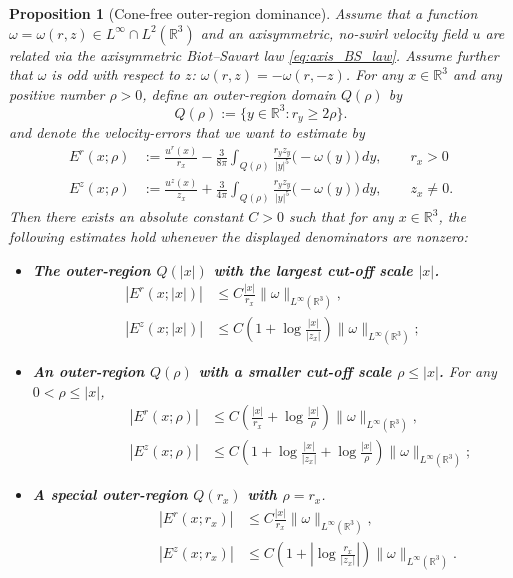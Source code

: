 \documentclass[reqno,11pt]{amsart}
\newtheorem{proposition}[theorem]{Proposition}
\begin{document}
\begin{proposition}[Cone-free outer-region dominance]
\label{prop:cone_free_key_lem}
    Assume that a function $\omega=\omega(r,z) \in L^{\infty}\cap L^2(\mathbb{R}^3)$ and an axisymmetric, no-swirl velocity field $u$ are related via the axisymmetric Biot--Savart law \eqref{eq:axis_BS_law}.
Assume further that $\omega$ is odd with respect to $z$: $\omega(r,z) = -\omega(r,-z)$.
For any $x\in \mathbb{R}^3$ and any positive number $\rho> 0$, define an outer-region domain $Q(\rho)$ by
\[
Q(\rho) := \{ y \in \mathbb{R}^3 : r_y \ge 2\rho \}.
\]
and denote the velocity-errors that we want to estimate by
    \begin{align*}
        E^r(x;\rho)
        &:=
        \frac{u^r(x)}{r_x} - \frac{3}{8\pi} \int_{Q(\rho)} \frac{r_y z_y}{|y|^5} \big(-\omega(y) \big) \, dy, \qquad r_x>0
        \\
        E^z(x;\rho)
        &:=
         \frac{u^z(x)}{z_x} + \frac{3}{4\pi}   \int_{Q(\rho)} \frac{r_y z_y}{|y|^5} \big(-\omega(y) \big) \, dy, \qquad z_x\neq 0.
    \end{align*}
Then there exists an absolute constant $C > 0$ such that for any $x \in \mathbb{R}^3$, the following estimates hold whenever the displayed denominators are nonzero:
\begin{itemize}
\item \emph{\textbf{The outer-region $Q(|x|)$ with the largest cut-off scale $|x|$.}}
 \begin{align}
 \label{eq:Er_x}
     |E^r(x;|x|)| 
     &\leq C \frac{|x|}{r_x} \|\omega\|_{L^\infty (\mathbb{R}^3)},
     \\
     \nonumber
     |E^z(x;|x|)|
     &\leq C\left( 1+ \log \frac{|x|}{|z_x|}\right)\|\omega\|_{L^\infty (\mathbb{R}^3)};
 \end{align}
\item \emph{\textbf{An outer-region $Q(\rho)$ with a smaller cut-off scale $\rho \leq |x|$.}}
For any $0<\rho \leq |x|$,
\begin{align*}
     \quad\quad\quad\quad  |E^r(x;\rho)| 
     &\leq C \left( \frac{|x|}{r_x} 
     + \log \frac{|x|}{\rho} \right)
     \|\omega\|_{L^\infty (\mathbb{R}^3)}, 
     \\
     \quad \quad\quad\quad |E^z(x;\rho)|
     &\leq C\left( 1+ \log \frac{|x|}{|z_x|} + \log \frac{|x|}{\rho }\right)\|\omega\|_{L^\infty (\mathbb{R}^3)};
 \end{align*}
\item  \emph{\textbf{A special outer-region $Q(r_x)$ with $\rho=r_x$}.}
\begin{align}
    \label{eq:key_lem_ur_rx}
     \quad\quad\quad\quad\quad |E^r(x;r_x)| 
     &\leq C \frac{|x|}{r_x} 
     \|\omega\|_{L^\infty (\mathbb{R}^3)}, 
     \\
     \nonumber
     \quad\quad\quad\quad\quad |E^z(x;r_x)|
     &\leq C\left( 1+ \left| \log \frac{r_x}{|z_x|}\right|\right)\|\omega\|_{L^\infty (\mathbb{R}^3)}.
 \end{align}
\end{itemize}
\end{proposition}
\end{document}
